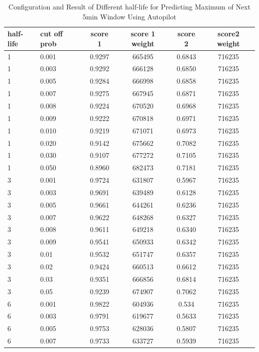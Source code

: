 \documentclass{article}
\begin{document}
\begin{longtable}[htbp]{l|l|*{4}{c}}
  \caption{Configuration and Result of Different half-life for Predicting Maximum of Next 5min Window Using Autopilot}
  \label{tab:tab1.11.2} \\
  \textbf{half-life} & \textbf{cut off prob} &
  \textbf{score 1} & \textbf{score 1 weight} & \textbf{score 2} & \textbf{score2
  weight} \\
  \hline
  1 & 0.001 & 0.9297 & 665495 & 0.6843 & 716235\\
  1 & 0.003 & 0.9292 & 666128 & 0.6850 & 716235\\
  1 & 0.005 & 0.9284 & 666998 & 0.6858 & 716235\\
  1 & 0.007 & 0.9275 & 667945 & 0.6871 & 716235\\
  1 & 0.008 & 0.9224 & 670520 & 0.6968 & 716235\\
  1 & 0.009 & 0.9222 & 670818 & 0.6971 & 716235\\
  1 & 0.010 & 0.9219 & 671071 & 0.6973 & 716235\\
  1 & 0.020 & 0.9142 & 675662 & 0.7082 & 716235\\
  1 & 0.030 & 0.9107 & 677272 & 0.7105 & 716235\\
  1 & 0.050 & 0.8960 & 682473 & 0.7181 & 716235\\
  3 & 0.001 & 0.9724 & 631807 & 0.5967 & 716235\\
  3 & 0.003 & 0.9691 & 639489 & 0.6128 & 716235\\
  3 & 0.005 & 0.9661 & 644261 & 0.6236 & 716235\\
  3 & 0.007 & 0.9622 & 648268 & 0.6327 & 716235\\
  3 & 0.008 & 0.9611 & 649218 & 0.6340 & 716235\\
  3 & 0.009 & 0.9541 & 650933 & 0.6342 & 716235\\
  3 & 0.01 & 0.9532 & 651747 & 0.6357 & 716235\\
  3 & 0.02 & 0.9424 & 660513 & 0.6612 & 716235\\
  3 & 0.03 & 0.9351 & 666856 & 0.6814 & 716235\\
  3 & 0.05 & 0.9239 & 674907 & 0.7062 & 716235\\
  6 & 0.001 & 0.9822 & 604936 & 0.534 & 716235\\
  6 & 0.003 & 0.9791 & 619677 & 0.5633 & 716235\\
  6 & 0.005 & 0.9753 & 628036 & 0.5807 & 716235\\
  6 & 0.007 & 0.9733 & 633727 & 0.5939 & 716235\\

\end{longtable}
\end{document}

